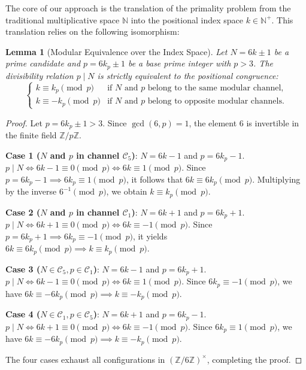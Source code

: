 \documentclass{article}
\numberwithin{equation}{section}
\theoremstyle{plain}
\newtheorem{lemma}[theorem]{Lemma}
\theoremstyle{definition}
\begin{document}
The core of our approach is the translation of the primality problem from the traditional multiplicative space $\mathbb{N}$ into the positional index space $k \in \mathbb{N}^+$. This translation relies on the following isomorphism:

\begin{lemma}[Modular Equivalence over the Index Space]
\label{lem:equiv-modular}
Let $N = 6k \pm 1$ be a prime candidate and $p = 6k_p \pm 1$ be a base prime integer with $p > 3$. The divisibility relation $p \mid N$ is strictly equivalent to the positional congruence:
\begin{equation}
\begin{cases}
k \equiv k_p \pmod p & \text{if } N \text{ and } p \text{ belong to the same modular channel,} \\
k \equiv -k_p \pmod p & \text{if } N \text{ and } p \text{ belong to opposite modular channels.}
\end{cases}
\end{equation}
\end{lemma}

\begin{proof}
Let $p = 6k_p \pm 1 > 3$. Since $\gcd(6, p) = 1$, the element $6$ is invertible in the finite field $\mathbb{Z}/p\mathbb{Z}$.

\textbf{Case 1 ($N$ and $p$ in channel $\mathcal{C}_5$)}: $N = 6k - 1$ and $p = 6k_p - 1$.
$p \mid N \iff 6k - 1 \equiv 0 \pmod p \iff 6k \equiv 1 \pmod p$.
Since $p = 6k_p - 1 \implies 6k_p \equiv 1 \pmod p$, it follows that $6k \equiv 6k_p \pmod p$. Multiplying by the inverse $6^{-1} \pmod p$, we obtain $k \equiv k_p \pmod p$.

\textbf{Case 2 ($N$ and $p$ in channel $\mathcal{C}_1$)}: $N = 6k + 1$ and $p = 6k_p + 1$.
$p \mid N \iff 6k + 1 \equiv 0 \pmod p \iff 6k \equiv -1 \pmod p$.
Since $p = 6k_p + 1 \implies 6k_p \equiv -1 \pmod p$, it yields $6k \equiv 6k_p \pmod p \implies k \equiv k_p \pmod p$.

\textbf{Case 3 ($N \in \mathcal{C}_5, p \in \mathcal{C}_1$)}: $N = 6k - 1$ and $p = 6k_p + 1$.
$p \mid N \iff 6k - 1 \equiv 0 \pmod p \iff 6k \equiv 1 \pmod p$.
Since $6k_p \equiv -1 \pmod p$, we have $6k \equiv -6k_p \pmod p \implies k \equiv -k_p \pmod p$.

\textbf{Case 4 ($N \in \mathcal{C}_1, p \in \mathcal{C}_5$)}: $N = 6k + 1$ and $p = 6k_p - 1$.
$p \mid N \iff 6k + 1 \equiv 0 \pmod p \iff 6k \equiv -1 \pmod p$.
Since $6k_p \equiv 1 \pmod p$, we have $6k \equiv -6k_p \pmod p \implies k \equiv -k_p \pmod p$.

The four cases exhaust all configurations in $(\mathbb{Z}/6\mathbb{Z})^\times$, completing the proof.
\end{proof}
\end{document}
